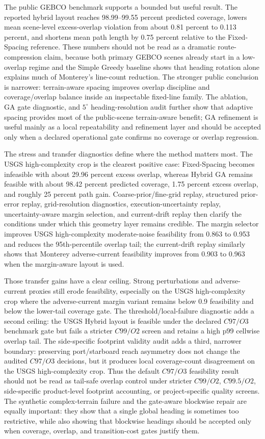 \documentclass[jmse,article,submit,moreauthors]{Definitions/mdpi}
\begin{document}
The public GEBCO benchmark supports a bounded but useful result. The reported hybrid layout reaches 98.99--99.55 percent predicted coverage, lowers mean scene-level excess-overlap violation from about 0.81 percent to 0.113 percent, and shortens mean path length by 0.75 percent relative to the Fixed-Spacing reference. These numbers should not be read as a dramatic route-compression claim, because both primary GEBCO scenes already start in a low-overlap regime and the Simple Greedy baseline shows that heading rotation alone explains much of Monterey's line-count reduction. The stronger public conclusion is narrower: terrain-aware spacing improves overlap discipline and coverage/overlap balance inside an inspectable fixed-line family. The ablation, GA gate diagnostic, and \(5^{\circ}\) heading-resolution audit further show that adaptive spacing provides most of the public-scene terrain-aware benefit; GA refinement is useful mainly as a local repeatability and refinement layer and should be accepted only when a declared operational gate confirms no coverage or overlap regression.

The stress and transfer diagnostics define where the method matters most. The USGS high-complexity crop is the clearest positive case: Fixed-Spacing becomes infeasible with about 29.96 percent excess overlap, whereas Hybrid GA remains feasible with about 98.42 percent predicted coverage, 1.75 percent excess overlap, and roughly 25 percent path gain. Coarse-prior/fine-grid replay, structured prior-error replay, grid-resolution diagnostics, execution-uncertainty replay, uncertainty-aware margin selection, and current-drift replay then clarify the conditions under which this geometry layer remains credible. The margin selector improves USGS high-complexity moderate-noise feasibility from 0.863 to 0.953 and reduces the 95th-percentile overlap tail; the current-drift replay similarly shows that Monterey adverse-current feasibility improves from 0.903 to 0.963 when the margin-aware layout is used.

Those transfer gains have a clear ceiling. Strong perturbations and adverse-current proxies still erode feasibility, especially on the USGS high-complexity crop where the adverse-current margin variant remains below 0.9 feasibility and below the lower-tail coverage gate. The threshold/local-failure diagnostic adds a second ceiling: the USGS Hybrid layout is feasible under the declared \(C97/O3\) benchmark gate but fails a stricter \(C99/O2\) screen and retains a high p99 cellwise overlap tail. The side-specific footprint validity audit adds a third, narrower boundary: preserving port/starboard reach asymmetry does not change the audited \(C97/O3\) decisions, but it produces local coverage-count disagreement on the USGS high-complexity crop. Thus the default \(C97/O3\) feasibility result should not be read as tail-safe overlap control under stricter \(C99/O2\), \(C99.5/O2\), side-specific product-level footprint accounting, or project-specific quality screens. The synthetic complex-terrain failure and the gate-aware blockwise repair are equally important: they show that a single global heading is sometimes too restrictive, while also showing that blockwise headings should be accepted only when coverage, overlap, and transition-cost gates justify them.
\end{document}
